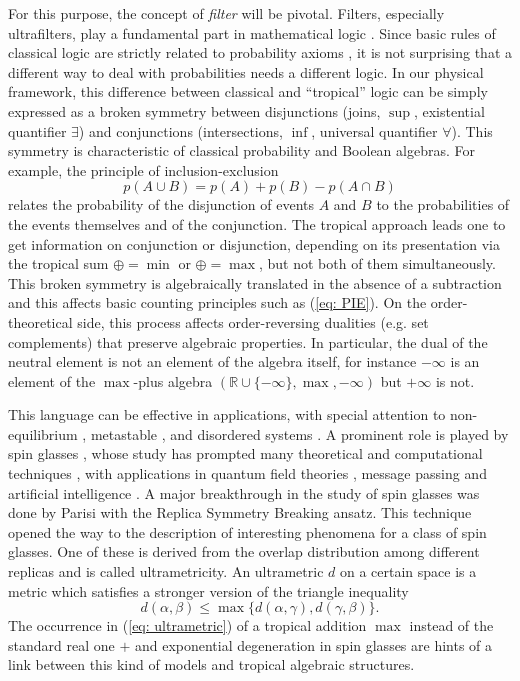 \documentclass[11pt,british,reqno]{article}
\numberwithin{equation}{section}
\numberwithin{figure}{section}
\numberwithin{table}{section}
\theoremstyle{definition}
\theoremstyle{definition}
\theoremstyle{plain}
\theoremstyle{plain}
\theoremstyle{remark}
\theoremstyle{plain}
\numberwithin{equation}{section}
\numberwithin{figure}{section}
\numberwithin{table}{section}
\theoremstyle{plain}
\begin{document}
For this purpose, the concept of \emph{filter} will be pivotal. Filters,
especially ultrafilters, play a fundamental part in mathematical logic
\cite{Mendelson2015}. Since basic rules of classical logic are
strictly related to probability axioms \cite{Jaynes2003}, it is
not surprising that a different way to deal with probabilities needs
a different logic. In our physical framework, this difference
between classical and ``tropical'' logic can be simply expressed
as a broken symmetry between disjunctions (joins, $\sup$, existential
quantifier $\exists$) and conjunctions (intersections, $\inf$, universal
quantifier $\forall$). This symmetry is characteristic of classical probability and Boolean algebras. For example, the principle of inclusion-exclusion 
\begin{equation}
p(A\cup B)=p(A)+p(B)-p(A\cap B)\label{eq: PIE}
\end{equation}
relates the probability of the disjunction of events $A$ and $B$
to the probabilities of the events themselves and of the conjunction.
The tropical approach leads one to get information on conjunction
or disjunction, depending on its presentation via the tropical sum $\oplus=\min$ or
$\oplus=\max$, but not both of them simultaneously. This broken
symmetry is algebraically translated in the absence of a subtraction and
this affects basic counting principles such as (\ref{eq: PIE}). On
the order-theoretical side, this process affects order-reversing dualities
(e.g. set complements) that preserve algebraic properties. In particular,
the dual of the neutral element is not an element of the algebra itself,
for instance $-\infty$ is an element of the $\max$-plus algebra $(\mathbb{R}\cup\{-\infty\},\max,-\infty)$ 
but $+\infty$ is not. 

This language can be effective in applications, with special attention to non-equilibrium \cite{Langer1969,Newman1980}, metastable \cite{Newman1997}, and disordered systems \cite{Derrida1983}. A prominent role is played by spin glasses \cite{MPV1987},
whose study has prompted many theoretical and computational techniques 
\cite{BinderYoung1986}, with applications in quantum field theories \cite{RyuTakayanagi2006}, message passing \cite{Mezard2014} and artificial intelligence \cite{Mezard2002,Mezard2005}. 
A major breakthrough in the study of spin glasses was done by Parisi
\cite{Parisi1980} with the Replica Symmetry Breaking ansatz. This
technique opened the way to the description of interesting phenomena
for a class of spin glasses. One of these is derived
from the overlap distribution among different replicas and is called
ultrametricity. An ultrametric $d$ on a certain space is a metric
which satisfies a stronger version of the triangle inequality 
\begin{equation}
d(\alpha,\beta)\leq\max\{d(\alpha,\gamma),d(\gamma,\beta)\}.\label{eq: ultrametric}
\end{equation}
The occurrence in (\ref{eq: ultrametric}) of a tropical addition
$\max$ instead of the standard real one $+$ and exponential degeneration
in spin glasses \cite{Sobotta1986} are hints of a link between this
kind of models and tropical algebraic structures.
\end{document}
